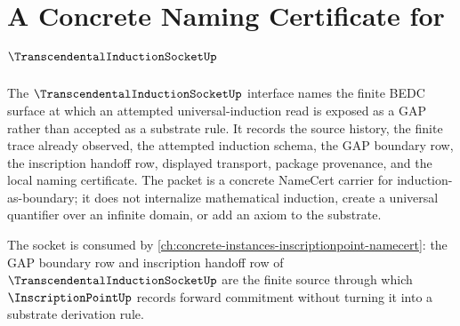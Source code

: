\chapter{A Concrete Naming Certificate for $\TranscendentalInductionSocketUp$}
\label{ch:concrete-instances-transcendentalinductionsocket-namecert}

The $\TranscendentalInductionSocketUp$ interface names the finite BEDC surface at which an attempted universal-induction read is exposed as a GAP rather than accepted as a substrate rule. It records the source history, the finite trace already observed, the attempted induction schema, the GAP boundary row, the inscription handoff row, displayed transport, package provenance, and the local naming certificate. The packet is a concrete NameCert carrier for induction-as-boundary; it does not internalize mathematical induction, create a universal quantifier over an infinite domain, or add an axiom to the substrate.

The socket is consumed by \autoref{ch:concrete-instances-inscriptionpoint-namecert}: the GAP boundary row and inscription handoff row of $\TranscendentalInductionSocketUp$ are the finite source through which $\InscriptionPointUp$ records forward commitment without turning it into a substrate derivation rule.

